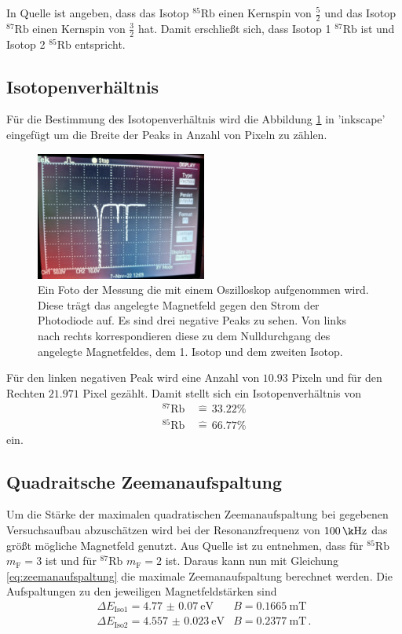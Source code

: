 In Quelle \cite{pdf_anleitung} ist angeben, dass das Isotop {$^{85}\text{Rb}$ einen Kernspin von $\frac{5}{2}$} und das Isotop $^{87}\text{Rb}$ einen Kernspin von $\frac{3}{2}$ hat.
Damit erschließt sich, dass Isotop 1  $^{87}\text{Rb}$ ist und Isotop 2 $^{85}\text{Rb}$ entspricht.

\subsection{Isotopenverhältnis}
Für die Bestimmung des Isotopenverhältnis wird die Abbildung \ref{fig:isotop} in 'inkscape' \cite{Inkscape} eingefügt um die Breite der Peaks in Anzahl von Pixeln zu zählen.

\begin{figure}
    \centering
    \includegraphics[width=0.5\textwidth]{Data/isotope.jpeg}
    \caption{Ein Foto der Messung die mit einem Oszilloskop aufgenommen wird.
    Diese trägt das angelegte Magnetfeld gegen den Strom der Photodiode auf.
    Es sind drei negative Peaks zu sehen.
    Von links nach rechts korrespondieren diese zu dem Nulldurchgang des angelegte Magnetfeldes, dem 1. Isotop und dem zweiten Isotop.}
    \label{fig:isotop}
\end{figure}
Für den linken negativen Peak wird eine Anzahl von $10.93$ Pixeln und für den Rechten $21.971$ Pixel gezählt.
Damit stellt sich ein Isotopenverhältnis von 
\begin{align*}
    ^{87}\text{Rb} \, &\widehat{=}\, 33.22\% \\
    ^{85}\text{Rb} \, &\widehat{=}\, 66.77\%
\end{align*}
ein.

\subsection{Quadraitsche Zeemanaufspaltung}
Um die Stärke der maximalen quadratischen Zeemanaufspaltung bei gegebenen Versuchsaufbau abzuschätzen wird bei der Resonanzfrequenz von $\SI{100}{\k\Hz}$ das größt mögliche Magnetfeld genutzt.
Aus Quelle \cite{pdf_anleitung} ist zu entnehmen, dass für $^{85}\text{Rb}$ $m_\text{F} = 3$ ist und für $^{87}\text{Rb}$ $m_\text{F} = 2$ ist.
Daraus kann nun mit Gleichung \eqref{eq:zeemanaufspaltung} die maximale Zeemanaufspaltung berechnet werden.
Die Aufspaltungen zu den jeweiligen Magnetfeldstärken sind
\begin{align*}
    \Delta E_\text{Iso1} = \SI{4.77(7)}{\eV} & B=\SI{0.1665}{\m\tesla} \\
    \Delta E_\text{Iso2} = \SI{4.557(23)}{\eV} & B=\SI{0.2377}{\m\tesla}  \, .
\end{align*}

